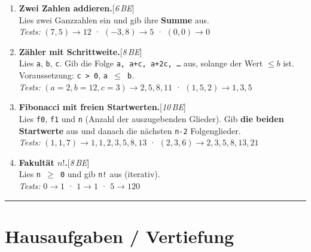\documentclass[11pt,a4paper]{scrartcl}
\newenvironment{aufgaben}{%
  \begin{enumerate}[leftmargin=*,label=\textbf{Aufgabe~\arabic*:}, itemsep=0.6em]
  }{\end{enumerate}}
\newcommand{\punkte}[1]{\hfill{\small[\textit{#1\,BE}]}}%
\begin{document}
  \begin{aufgaben}

    \item \textbf{Zwei Zahlen addieren.}\punkte{6}\\
    Lies zwei Ganzzahlen ein und gib ihre \textbf{Summe} aus.\\
    \emph{Tests:} $(7,5)\to 12$ \;·\; $(-3,8)\to 5$ \;·\; $(0,0)\to 0$

    \item \textbf{Zähler mit Schrittweite.}\punkte{8}\\
    Lies \texttt{a}, \texttt{b}, \texttt{c}. Gib die Folge \texttt{a, a+c, a+2c, …} aus, solange der Wert \textbf{$\leq b$} ist. Voraussetzung: \texttt{c > 0}, \texttt{a $\leq$ b}.\\
    \emph{Tests:} $(a{=}2,b{=}12,c{=}3)\to 2,5,8,11$ \;·\; $(1,5,2)\to 1,3,5$

    \item \textbf{Fibonacci mit freien Startwerten.}\punkte{10}\\
    Lies \texttt{f0}, \texttt{f1} und \texttt{n} (Anzahl der auszugebenden Glieder). Gib \textbf{die beiden Startwerte} aus und danach die nächsten \texttt{n-2} Folgenglieder.\\
    \emph{Tests:} $(1,1,7)\to 1,1,2,3,5,8,13$ \;·\; $(2,3,6)\to 2,3,5,8,13,21$

    \item \textbf{Fakultät $n!$.}\punkte{8}\\
    Lies \texttt{n $\geq$ 0} und gib \texttt{n!} aus (iterativ).\\
    \emph{Tests:} $0\to 1$ \;·\; $1\to 1$ \;·\; $5\to 120$

  \end{aufgaben}

  \vspace{0.3em}
  \hrule
  \vspace{0.6em}

  \section*{Hausaufgaben / Vertiefung}
\end{document}
